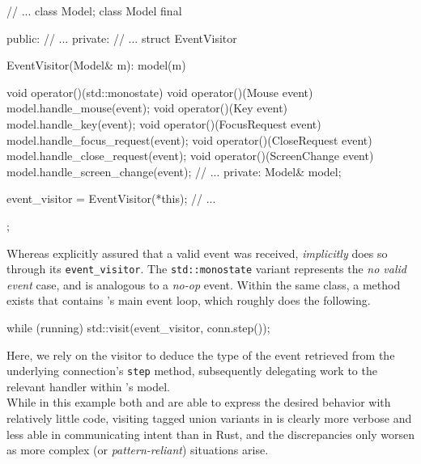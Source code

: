 \begin{cppblock}
  // ...
  class Model;
  class Model final
  {
  public:
    // ...
  private:
    // ...
    struct EventVisitor
    {
      EventVisitor(Model& m): model(m) {}

      void operator()(std::monostate) {}
      void operator()(Mouse event) {
        model.handle_mouse(event);
      }
      void operator()(Key event) {
        model.handle_key(event);
      }
      void operator()(FocusRequest event) {
        model.handle_focus_request(event);
      }
      void operator()(CloseRequest event) {
        model.handle_close_request(event);
      }
      void operator()(ScreenChange event) {
        model.handle_screen_change(event);
      }
      // ...
    private:
      Model& model;
    } event_visitor = EventVisitor(*this);
    // ...
  };
\end{cppblock}

Whereas  \wmrs  explicitly assured  that  a  valid  event was  received,  \wmcpp
\textit{implicitly}  does so  through  its \texttt{event_visitor}.  The
\texttt{std::monostate} variant represents  the \textit{no valid event}
case,  and is  analogous to  a \textit{no-op}  event. Within  the same  class, a
method exists that contains \mbox{\wmcpp}'s  main event loop, which roughly does
the following.

\begin{cppblock}
  while (running)
    std::visit(event_visitor, conn.step());
\end{cppblock}

Here, we rely on the visitor to deduce  the type of the event retrieved from the
underlying connection's  \texttt{step} method,  subsequently delegating
work to the relevant handler within \wmcpp's model.\\

While in  this example  both \wmrs and  \wmcpp are able  to express  the desired
behavior with relatively little code, visiting  tagged union variants in \cpp is
clearly more  verbose and less  able in communicating  intent than in  Rust, and
the  discrepancies only  worsen  as more  complex (or  \textit{pattern-reliant})
situations arise\cite{stdvisitwrong}.
